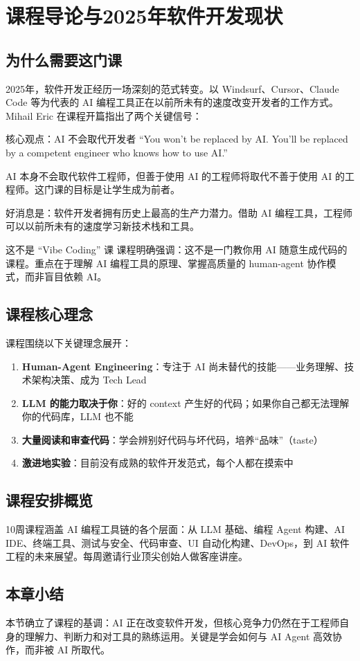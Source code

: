 \section{课程导论与2025年软件开发现状}

\subsection{为什么需要这门课}

2025年，软件开发正经历一场深刻的范式转变。以 Windsurf、Cursor、Claude Code 等为代表的 AI 编程工具正在以前所未有的速度改变开发者的工作方式。Mihail Eric 在课程开篇指出了两个关键信号：

\begin{importantbox}{核心观点：AI 不会取代开发者}
``You won't be replaced by AI. You'll be replaced by a competent engineer who knows how to use AI.''

AI 本身不会取代软件工程师，但善于使用 AI 的工程师将取代不善于使用 AI 的工程师。这门课的目标是让学生成为前者。
\end{importantbox}

好消息是：软件开发者拥有历史上最高的生产力潜力。借助 AI 编程工具，工程师可以以前所未有的速度学习新技术栈和工具。

\begin{warningbox}{这不是 ``Vibe Coding'' 课}
课程明确强调：这不是一门教你用 AI 随意生成代码的课程。重点在于理解 AI 编程工具的原理、掌握高质量的 human-agent 协作模式，而非盲目依赖 AI。
\end{warningbox}

\subsection{课程核心理念}

课程围绕以下关键理念展开：

\begin{enumerate}
    \item \textbf{Human-Agent Engineering}：专注于 AI 尚未替代的技能——业务理解、技术架构决策、成为 Tech Lead
    \item \textbf{LLM 的能力取决于你}：好的 context 产生好的代码；如果你自己都无法理解你的代码库，LLM 也不能
    \item \textbf{大量阅读和审查代码}：学会辨别好代码与坏代码，培养``品味''（taste）
    \item \textbf{激进地实验}：目前没有成熟的软件开发范式，每个人都在摸索中
\end{enumerate}

\subsection{课程安排概览}

10周课程涵盖 AI 编程工具链的各个层面：从 LLM 基础、编程 Agent 构建、AI IDE、终端工具、测试与安全、代码审查、UI 自动化构建、DevOps，到 AI 软件工程的未来展望。每周邀请行业顶尖创始人做客座讲座。

\subsection{本章小结}

本节确立了课程的基调：AI 正在改变软件开发，但核心竞争力仍然在于工程师自身的理解力、判断力和对工具的熟练运用。关键是学会如何与 AI Agent 高效协作，而非被 AI 所取代。

